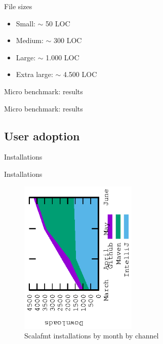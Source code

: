 \documentclass[xcolor=dvipsnames]{beamer}
\theoremstyle{definition}
\begin{document}
\begin{frame}{File sizes}
  \begin{table}[H]
    \centering
    \caption{Lines of code per source file. Collected from sample of $\sim$27.000 source files with total 3.2 million lines of code.}\label{tab:micro}
    
  \end{table}
  \begin{itemize}
    \item Small: $\sim$ 50 LOC
    \item Medium: $\sim$ 300 LOC
    \item Large: $\sim$ 1.000 LOC
    \item Extra large: $\sim$ 4.500 LOC
  \end{itemize}
\end{frame}

\begin{frame}{Micro benchmark: results}
  \begin{table}[H]
    \centering
    
  \end{table}
\end{frame}

\begin{frame}{Micro benchmark: results}
  \begin{table}[H]
    \centering
    
  \end{table}
\end{frame}


\subsection{User adoption}

\begin{frame}{Installations}
  \begin{table}[]
    \centering
    \caption{Download numbers for scalafmt}
     
  \end{table}
\end{frame}

\begin{frame}{Installations}
  \begin{figure}[H]
    \centering
    \includegraphics[angle=-90,width=0.5\textwidth]{tables/month.eps}
    \caption{Scalafmt installations by month by channel}
  \end{figure}
\end{frame}
\end{document}
